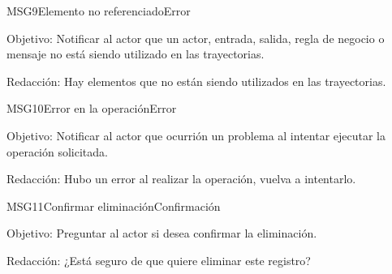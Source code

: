 \begin{mensaje}{MSG9}{Elemento no referenciado}{Error}
    \item[Objetivo:] Notificar al actor que un actor, entrada, salida, regla de negocio o mensaje no está siendo utilizado en las trayectorias.
    \item[Redacción:] Hay elementos que no están siendo utilizados en las trayectorias.
\end{mensaje}

\begin{mensaje}{MSG10}{Error en la operación}{Error}
    \item[Objetivo:] Notificar al actor que ocurrión un problema al intentar ejecutar la operación solicitada.
    \item[Redacción:] Hubo un error al realizar la operación, vuelva a intentarlo.
\end{mensaje}

\begin{mensaje}{MSG11}{Confirmar eliminación}{Confirmación}
    \item[Objetivo:] Preguntar al actor si desea confirmar la eliminación.
    \item[Redacción:] ¿Está seguro de que quiere eliminar este registro?
\end{mensaje}

